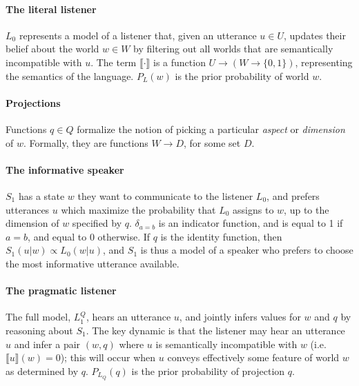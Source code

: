 \documentclass[9pt,twocolumn,twoside,lineno]{pnas-new}
\newcommand{\Listener}{L}
\newcommand{\QLONE}{\Listener_{{1}}^{{Q}}}
\begin{document}
	\paragraph{The literal listener} $L_0$ represents a model of a listener that, given an utterance $u\in U$, updates their belief about the world $w\in W$ by filtering out all worlds that are semantically incompatible with $u$. The term $\llbracket\cdot\rrbracket$ is a function $U\to(W\to\{0, 1\})$, representing the semantics of the language. $P_L(w)$ is the prior probability of world $w$. 


	\paragraph{Projections} 
	Functions $q\in Q$ formalize the notion of picking a particular \emph{aspect} or \emph{dimension} of $w$. Formally, they are functions $W \to D$, for some set $D$.
	

	\paragraph{The informative speaker} $S_1$ has a state $w$ they want to communicate to the listener $L_0$, and prefers utterances $u$ which maximize the probability that $L_0$ assigns to $w$, up to the dimension of $w$ specified by $q$. $\delta_{a=b}$ is an indicator function, and is equal to 1 if $a=b$, and equal to 0 otherwise. If $q$ is the identity function, then $S_1(u|w) \propto L_0(w|u)$, and $S_1$ is thus a model of a speaker who prefers to choose the most informative utterance available. 
	
	\paragraph{The pragmatic listener} The full model, $\QLONE$, hears an utterance $u$, and jointly infers values for $w$ and $q$ by reasoning about $S_1$. The key dynamic is that the listener may hear an utterance $u$ and infer a pair $(w,q)$ where $u$ is semantically incompatible with $w$ (i.e. $\llbracket u\rrbracket(w)=0$); this will occur when $u$ conveys effectively some feature of world $w$ as determined by $q$. $P_{L_Q}(q)$ is the prior probability of projection $q$.
\end{document}

